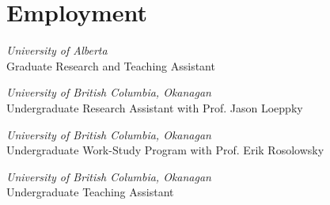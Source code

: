 \documentclass[letterpaper,11pt]{article}
\newlength{\mainindent} \setlength{\mainindent}{12pt}
\newlength{\contentindent} \setlength{\contentindent}{19ex}
\newenvironment{datelist}{
  \begingroup
  \raggedright
  \begin{description}[labelindent=\mainindent,leftmargin=\contentindent,
      style=sameline,font=\normalfont,topsep=0pt,partopsep=0pt,parsep=0pt,
      itemsep=4pt]
}{
  \end{description}
  \endgroup
}
\begin{document}
\section*{Employment}
\begin{datelist}
\item[2014\textendash{}present] \emph{University of Alberta} \\ Graduate Research and Teaching Assistant
\item[2013-2014] \emph{University of British Columbia, Okanagan} \\ Undergraduate Research Assistant with Prof. Jason Loeppky
\item[2012] \emph{University of British Columbia, Okanagan} \\ Undergraduate Work-Study Program with Prof. Erik Rosolowsky
\item[2011-2014] \emph{University of British Columbia, Okanagan} \\ Undergraduate Teaching Assistant
\end{datelist}

\end{document}
